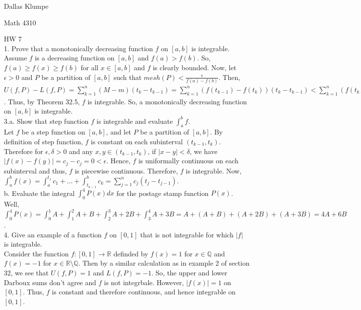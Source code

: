 \documentclass[12pt]{article}
\begin{document}
\noindent Dallas Klumpe

\noindent Math 4310

\noindent HW 7\\

1. Prove that a monotonically decreasing function $f$ on $[a,b]$ is integrable.\\
Assume $f$ is a decreasing function on $[a,b]$ and $f(a)>f(b)$. So, $f(a)\geq f(x)\geq f(b)$ for all $x\in[a,b]$ and $f$ is clearly bounded. Now, let $\epsilon>0$ and $P$ be a partition of $[a,b]$ such that $mesh(P)<\frac{\epsilon}{f(a)-f(b)}$. Then, $U(f,P)-L(f,P)=\sum_{k=1}^n(M-m)(t_k-t_{k-1})=\sum_{k=1}^n(f(t_{k-1})-f(t_k))(t_k-t_{k-1})<\sum_{k=1}^n(f(t_{k-1})-f(t_k))(\frac{\epsilon}{f(a)-f(b)})=(f(a)-f(b))(\frac{\epsilon}{f(a)-f(b)})=\epsilon$. Thus, by Theorem 32.5, $f$ is integrable. So, a monotonically decreasing function on $[a,b]$ is integrable.\\[20pt]

3.a. Show that step function $f$ is integrable and evaluate $\int_a^bf$.\\
Let $f$ be a step function on $[a,b]$, and let $P$ be a partition of $[a,b]$. By definition of step function, $f$ is constant on each subinterval $(t_{k-1},t_k)$. Therefore for $\epsilon,\delta>0$ and any $x,y\in(t_{k-1},t_k)$, if $|x-y|<\delta$, we have $|f(x)-f(y)|=c_j-c_j=0<\epsilon$. Hence, $f$ is uniformally continuous on each subinterval and thus, $f$ is piecewise continuous. Therefore, $f$ is integrable. Now, $\int_a^bf(x)=\int_a^{t_1}c_1+...+\int_{t_{k-1}}^bc_k=\sum_{j=1}^nc_j(t_j-t_{j-1})$.\\
b. Evaluate the integral $\int_0^4P(x)dx$ for the postage stamp function $P(x)$.\\
Well, $\int_0^4P(x)=\int_0^1A+\int_1^2A+B+\int_2^3A+2B+\int_3^4A+3B=A+(A+B)+(A+2B)+(A+3B)=4A+6B$.\\[20pt]

4. Give an example of a function $f$ on $[0,1]$ that is not integrable for which $|f|$ is integrable.\\
Consider the function $f:[0,1]\rightarrow\mathbb{R}$ definded by $f(x)=1$ for $x\in\mathbb{Q}$ and $f(x)=-1$ for $x\in\mathbb{R}\setminus\mathbb{Q}$. Then by a similar calculation as in example 2 of section 32, we see that $U(f,P)=1$ and $L(f,P)=-1$. So, the upper and lower Darboux sums don't agree and $f$ is not integrbale. However, $|f(x)|=1$ on $[0,1]$. Thus, $f$ is constant and therefore continuous, and hence integrable on $[0,1]$.\\[20pt]
\end{document}
